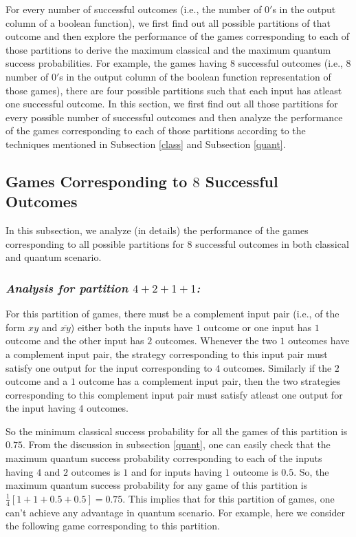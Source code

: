 \documentclass[]{svjour3}
\begin{document}
For every number of successful outcomes (i.e., the number of $0'$s in the output column of a boolean function), we first find out all possible partitions of that outcome and then explore the performance of the games corresponding to each of those partitions to derive the maximum classical and the maximum quantum success probabilities. For example, the games having $8$ successful outcomes (i.e., $8$ number of $0'$s in the output column of the boolean function representation of those games), there are four possible partitions such that each input has atleast one successful outcome. In this section, we first find out all those partitions for every possible number of successful outcomes and then analyze the performance of the games corresponding to each of those partitions according to the techniques mentioned in Subsection \ref{class} and Subsection \ref{quant}. 

\subsection{Games Corresponding to $8$ Successful Outcomes}


In this subsection, we analyze (in details) the performance of the games corresponding to all possible partitions for $8$ successful outcomes in both classical and quantum scenario.


\subsubsection{\it Analysis for partition $4+2+1+1$:}

For this partition of games, there must be a complement input pair (i.e., of the form $xy$ and $\overline{xy}$) either both the inputs have $1$ outcome or one input has $1$ outcome and the other input has $2$ outcomes. Whenever the two $1$ outcomes have a complement input pair, the strategy corresponding to this input pair must satisfy one output for the input corresponding to $4$ outcomes. Similarly if the $2$ outcome and a $1$ outcome has a complement input pair, then the two strategies corresponding to this complement input pair must satisfy atleast one output for the input having $4$ outcomes.

So the minimum classical success probability for all the games of this partition is $0.75$. From the discussion in subsection \ref{quant}, one can easily check that the maximum quantum success probability corresponding to each of the inputs having $4$ and $2$ outcomes is $1$ and for inputs having $1$ outcome is $0.5$. So, the maximum quantum success probability for any game of this partition is  $\frac{1}{4}[1+1+0.5+0.5] = 0.75$. This implies that for this partition of games, one can't achieve any advantage in quantum scenario. For example, here we consider the following game corresponding to this partition.
\end{document}
